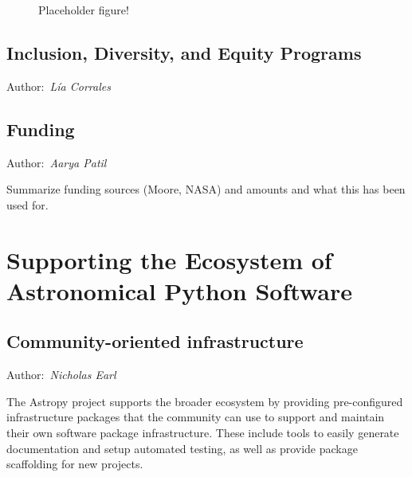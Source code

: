 \documentclass[modern]{aastex631}
\newcommand{\secauthor}[1]{{\color{blue}Author:~\textit{#1}}}
\begin{document}
\begin{figure}
    \begin{centering}
        \caption{Placeholder figure!}
        \label{fig:contributor-summary}
    \end{centering}
\end{figure}


\subsection{Inclusion, Diversity, and Equity Programs} \label{sec:project-ide}

\secauthor{Lía Corrales}


\subsection{Funding} \label{sec:project-funding}

\secauthor{Aarya Patil}

Summarize funding sources (Moore, NASA) and amounts and what this has been used
for.


\section{Supporting the Ecosystem of Astronomical Python Software}
\label{sec:ecosystem}

\subsection{Community-oriented infrastructure}

\secauthor{Nicholas Earl}

The Astropy project supports the broader ecosystem by providing pre-configured
infrastructure packages that the community can use to support and maintain
their own software package infrastructure. These include tools to easily
generate documentation and setup automated testing, as well as provide
package scaffolding for new projects.
\end{document}

